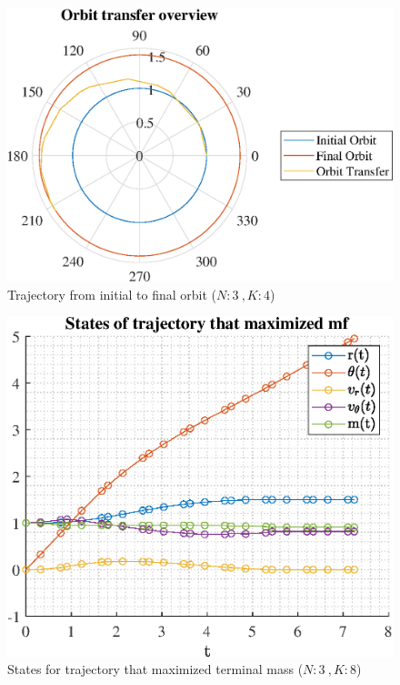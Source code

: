 \documentclass[]{article}
\begin{document}
	\begin{figure}
		\centering
		\includegraphics[scale=0.75]{orbit_N3_K4_C2_mf.eps}
		\caption{Trajectory from initial to final orbit (\(N:3\ , K:4\))}
		\label{fig:orbit_N3_K4_C2_mf}
	\end{figure}
	\begin{figure}
		\centering
		\includegraphics[scale=0.75]{states_N3_K8_C2_mf.eps}
		\caption{States for trajectory that maximized terminal mass (\(N:3\ , K:8\))}
		\label{fig:states_N3_K8_C2_mf}
	\end{figure}
\end{document}
